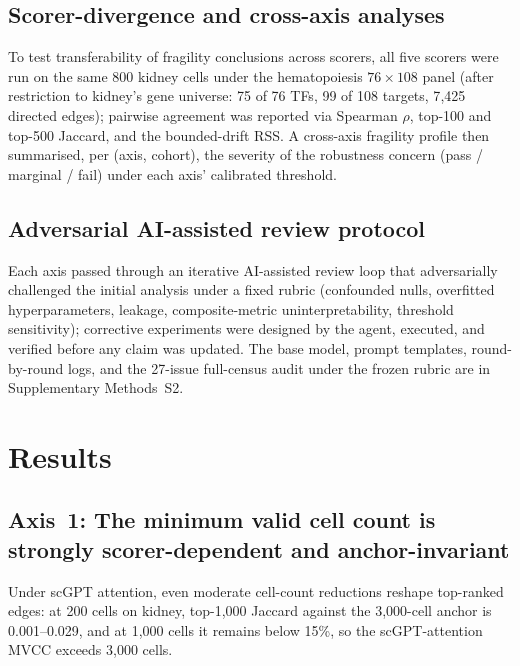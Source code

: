 \documentclass[unnumsec,webpdf,contemporary,large,namedate]{oup-authoring-template}
\begin{document}
\subsection{Scorer-divergence and cross-axis analyses}

To test transferability of fragility conclusions across scorers, all
five scorers were run on the same 800 kidney cells under the
hematopoiesis $76 \times 108$ panel (after restriction to kidney's
gene universe: 75 of 76 TFs, 99 of 108 targets, 7{,}425 directed
edges); pairwise agreement was reported via Spearman $\rho$, top-100
and top-500 Jaccard, and the bounded-drift RSS. A cross-axis fragility
profile then summarised, per (axis, cohort), the severity of the
robustness concern (pass / marginal / fail) under each axis'
calibrated threshold.

\subsection{Adversarial AI-assisted review protocol}

Each axis passed through an iterative AI-assisted review loop that
adversarially challenged the initial analysis under a fixed rubric
(confounded nulls, overfitted hyperparameters, leakage, composite-metric
uninterpretability, threshold sensitivity); corrective experiments were
designed by the agent, executed, and verified before any claim was
updated. The base model, prompt templates, round-by-round logs, and the
27-issue full-census audit under the frozen rubric are in Supplementary
Methods~S2.

\section{Results}

\subsection{Axis~1: The minimum valid cell count is strongly scorer-dependent
and anchor-invariant}

Under scGPT attention, even moderate cell-count reductions reshape
top-ranked edges: at 200 cells on kidney, top-1{,}000 Jaccard against
the 3{,}000-cell anchor is 0.001--0.029, and at 1{,}000 cells it
remains below 15\%, so the scGPT-attention MVCC exceeds 3{,}000 cells.
\end{document}
